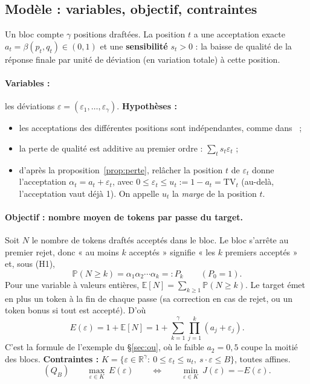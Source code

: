 \documentclass[11pt,a4paper]{article}
\newcommand{\R}{\mathbb{R}}
\newcommand{\TV}{\mathrm{TV}}
\newcommand{\Prob}{\mathbb{P}}
\newcommand{\Esp}{\mathbb{E}}
\theoremstyle{plain}
\theoremstyle{definition}
\begin{document}
\subsection{Modèle : variables, objectif, contraintes}\label{sec:modeleII}
Un bloc compte $\gamma$ positions draftées. La position $t$ a une acceptation exacte $a_t=\beta(p_t,q_t)\in(0,1)$ et une \textbf{sensibilité} $s_t>0$ : la baisse de qualité de la réponse finale par unité de déviation (en variation totale) à cette position.

\paragraph{Variables :} les déviations $\varepsilon=(\varepsilon_1,\dots,\varepsilon_\gamma)$. \textbf{Hypothèses :}
\begin{itemize}
\item[(H1)] les acceptations des différentes positions sont indépendantes, comme dans~\cite{leviathan} ;
\item[(H2)] la perte de qualité est additive au premier ordre : $\sum_ts_t\varepsilon_t$ ;
\item[(H3)] d'après la proposition~\ref{prop:perte}, relâcher la position $t$ de $\varepsilon_t$ donne l'acceptation $\alpha_t=a_t+\varepsilon_t$, avec $0\le\varepsilon_t\le u_t:=1-a_t=\TV_t$ (au-delà, l'acceptation vaut déjà 1). On appelle $u_t$ la \emph{marge} de la position $t$.
\end{itemize}

\paragraph{Objectif : nombre moyen de tokens par passe du target.} Soit $N$ le nombre de tokens draftés acceptés dans le bloc. Le bloc s'arrête au premier rejet, donc « au moins $k$ acceptés » signifie « les $k$ premiers acceptés » et, sous (H1),
\[\Prob(N\ge k)=\alpha_1\alpha_2\cdots\alpha_k=:P_k\qquad(P_0=1).\]
Pour une variable à valeurs entières, $\Esp[N]=\sum_{k\ge1}\Prob(N\ge k)$. Le target émet en plus un token à la fin de chaque passe (sa correction en cas de rejet, ou un token bonus si tout est accepté). D'où
\[E(\varepsilon)=1+\Esp[N]=1+\sum_{k=1}^{\gamma}\prod_{j=1}^{k}(a_j+\varepsilon_j).\]
C'est la formule de l'exemple du §\ref{sec:ou}, où le faible $a_2=0{,}5$ coupe la moitié des blocs.
\textbf{Contraintes :} $K=\{\varepsilon\in\R^\gamma:\ 0\le\varepsilon_t\le u_t,\ s\cdot\varepsilon\le B\}$, toutes affines.
\[(Q_B)\qquad \max_{\varepsilon\in K}\ E(\varepsilon)\qquad\Longleftrightarrow\qquad \min_{\varepsilon\in K}\ J(\varepsilon)=-E(\varepsilon).\]
\end{document}
